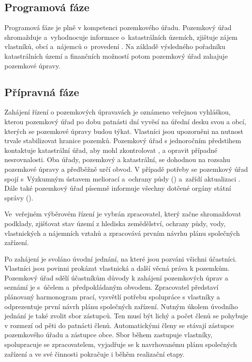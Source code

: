 \subsection{Programová fáze}
\label{programova_faze}

Programová fáze je plně v kompetenci pozemkového úřadu. Pozemkový úřad shromažduje a~vyhodnocuje informace o~katastrálních územích, zjištuje zájem vlastníků, obcí a~nájemců o~provedení . Na základě výsledného pořadníku katastrálních území a finančních možností potom pozemkový úřad zahajuje pozemkové úpravy.

\subsection{Přípravná fáze}
\label{pripravna_faze}

Zahájení řízení o pozemkových úpravavách je oznámeno veřejnou vyhláškou, kterou pozemkový úřad po dobu patnásti dní vyvěsí na úřední desku svou a obcí, kterých se pozemkové úpravy budou týkat. Vlastníci jsou upozorněni na nutnost trvale stabilizovat hranice pozemků. Pozemkový úřad s jednoročním předstihem kontaktuje katastrální úřad, aby mohl zkontrolovat ,  a opravit případné nesrovnalosti. Oba úřady, pozemkový a katastrální, se dohodnou na rozsahu pozemkové úpravy a předběžně určí obvod. V případě potřeby se pozemkový úřad spojí s~Výzkumným ústavem meliorací a~ochrany půdy () a~zařídí aktualizaci . Dále také pozemkový úřad písemně informuje všechny dotčené orgány státní správy ().

Ve~veřejném výběrovém řízení je vybrán zpracovatel, který začne shromaždovat podklady, zjišťovat stav území z hlediska zemědělství, ochrany půdy, vody, vlastnických a nájemních vztahů a zpracovává prvním návrhu plánu společných zařízení.

Po zahájení  je svoláno úvodní jednání, na které jsou pozváni všichni účastníci. Vlastníci jsou povinni prokázat vlastnická a další věcná práva k pozemkům. Pozemkový úřad sdělí účastníkům důvody k zahájení pozemkových úprav a seznámí je s~účelem a~předpokládaným obvodem. Zpracovatel představí plánovaný harmonogram prací, vysvětlí potřebu spolupráce s vlastníky a odprezentuje první návrh plánu společných zařízení. Nutným úkolem úvodního jednání je také zvolit sbor zástupců. Ten musí být lichý a počet členů se pohybuje v rozmezí od pěti do patnácti členů. Automatickými členy se stávají zástupce pozemkového úřadu a zástupce obce. Sbor během  zastupuje vlastníky, spolupracuje se zpracovatelem, vyjadřuje se k navrhovanému plánu společných zařízení a ve své činnosti pokračuje i běhěm realizační etapy.

